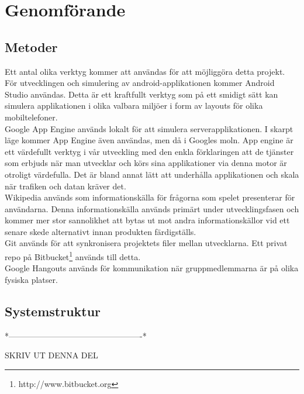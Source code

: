 \documentclass[12pt,a4paper]{article}
\begin{document}
\section{Genomförande}

\subsection{Metoder}
Ett antal olika verktyg kommer att användas för att möjliggöra detta projekt. För utvecklingen och simulering av android-applikationen kommer Android Studio användas. Detta är ett kraftfullt verktyg som på ett smidigt sätt kan simulera applikationen i olika valbara miljöer i form av layouts för olika mobiltelefoner. \cite{androidstudio}\\
Google App Engine används lokalt för att simulera serverapplikationen. I skarpt läge kommer App Engine även användas, men då i Googles moln. App engine är ett värdefullt verktyg i vår utveckling med den enkla förklaringen att de tjänster som erbjuds när man utvecklar och körs sina applikationer via denna motor är otroligt värdefulla. Det är bland annat lätt att underhålla applikationen och skala när trafiken och datan kräver det. \cite{googleappengine}\\
Wikipedia används som informationskälla för frågorna som spelet presenterar för användarna. Denna informationskälla används primärt under utvecklingsfasen och kommer mer stor sannolikhet att bytas ut mot andra informationskällor vid ett senare skede alternativt innan produkten färdigställs.\\
Git används för att synkronisera projektets filer mellan utvecklarna. Ett privat repo på Bitbucket\footnote{http://www.bitbucket.org} används till detta.\\
Google Hangouts används för kommunikation när gruppmedlemmarna är på olika fysiska platser.

\subsection{Systemstruktur}

*-------------------------------------------------*


                 SKRIV UT DENNA DEL
\end{document}
